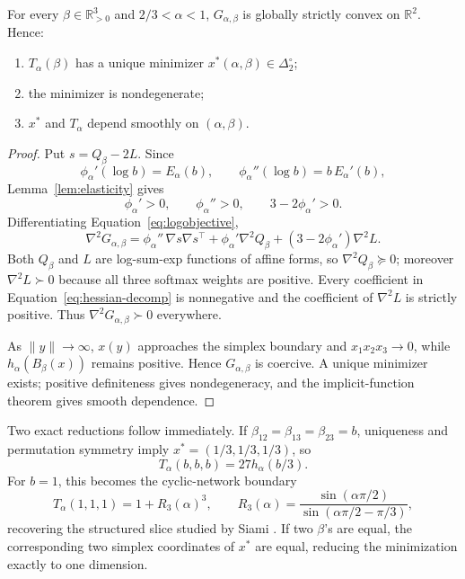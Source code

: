 \begin{Theorem}\label{thm:strict-convexity}
For every \(\beta\in\mathbb R_{>0}^3\) and \(2/3<\alpha<1\), \(G_{\alpha,\beta}\) is globally strictly convex on \(\mathbb R^2\). Hence:
\begin{enumerate}
\item \(T_\alpha(\beta)\) has a unique minimizer \(x^*(\alpha,\beta)\in\Delta_2^\circ\);
\item the minimizer is nondegenerate;
\item \(x^*\) and \(T_\alpha\) depend smoothly on \((\alpha,\beta)\).
\end{enumerate}
\end{Theorem}

\begin{proof}
Put \(s=Q_\beta-2L\). Since
\[
 \phi_\alpha'(\log b)=E_\alpha(b),
 \qquad
 \phi_\alpha''(\log b)=b\,E_\alpha'(b),
\]
Lemma~\ref{lem:elasticity} gives
\[
 \phi_\alpha'>0,\qquad
 \phi_\alpha''>0,\qquad
 3-2\phi_\alpha'>0.
\]
Differentiating Equation~\eqref{eq:logobjective},
\begin{equation}
 \nabla^2G_{\alpha,\beta}
 =
 \phi_\alpha''\,\nabla s\nabla s^\top
 +\phi_\alpha'\nabla^2Q_\beta
 +(3-2\phi_\alpha')\nabla^2L.
 \label{eq:hessian-decomp}
\end{equation}
Both \(Q_\beta\) and \(L\) are log-sum-exp functions of affine forms, so \(\nabla^2Q_\beta\succeq0\); moreover \(\nabla^2L\succ0\) because all three softmax weights are positive. Every coefficient in Equation~\eqref{eq:hessian-decomp} is nonnegative and the coefficient of \(\nabla^2L\) is strictly positive. Thus \(\nabla^2G_{\alpha,\beta}\succ0\) everywhere.

As \(\|y\|\to\infty\), \(x(y)\) approaches the simplex boundary and \(x_1x_2x_3\to0\), while \(h_\alpha(B_\beta(x))\) remains positive. Hence \(G_{\alpha,\beta}\) is coercive. A unique minimizer exists; positive definiteness gives nondegeneracy, and the implicit-function theorem gives smooth dependence.
\end{proof}

Two exact reductions follow immediately. If \(\beta_{12}=\beta_{13}=\beta_{23}=b\), uniqueness and permutation symmetry imply \(x^*=(1/3,1/3,1/3)\), so
\begin{equation}
 T_\alpha(b,b,b)=27h_\alpha(b/3).
 \label{eq:symmetric-slice}
\end{equation}
For \(b=1\), this becomes the cyclic-network boundary
\begin{equation}
 T_\alpha(1,1,1)=1+R_3(\alpha)^3,
 \qquad
 R_3(\alpha)
 =
 \frac{\sin(\alpha\pi/2)}
 {\sin(\alpha\pi/2-\pi/3)},
 \label{eq:siami-slice}
\end{equation}
recovering the structured slice studied by Siami \cite{Siami2021}. If two \(\beta\)'s are equal, the corresponding two simplex coordinates of \(x^*\) are equal, reducing the minimization exactly to one dimension.

